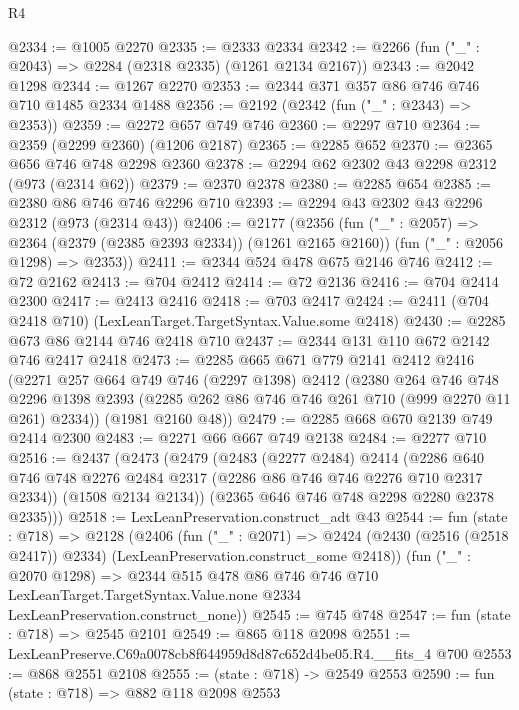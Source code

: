 \begin{lexlean}{R4}
\begin{coremodule}
@2334 := @1005 @2270
@2335 := @2333 @2334
@2342 := @2266 (fun ("_" : @2043) => @2284 (@2318 @2335) (@1261 @2134 @2167))
@2343 := @2042 @1298
@2344 := @1267 @2270
@2353 := @2344 @371 @357 @86 @746 @746 @710 @1485 @2334 @1488
@2356 := @2192 (@2342 (fun ("_" : @2343) => @2353))
@2359 := @2272 @657 @749 @746
@2360 := @2297 @710
@2364 := @2359 (@2299 @2360) (@1206 @2187)
@2365 := @2285 @652
@2370 := @2365 @656 @746 @748 @2298 @2360
@2378 := @2294 @62 @2302 @43 @2298 @2312 (@973 (@2314 @62))
@2379 := @2370 @2378
@2380 := @2285 @654
@2385 := @2380 @86 @746 @746 @2296 @710
@2393 := @2294 @43 @2302 @43 @2296 @2312 (@973 (@2314 @43))
@2406 := @2177
    (@2356
      (fun ("_" : @2057) => @2364 (@2379 (@2385 @2393 @2334)) (@1261 @2165 @2160))
      (fun ("_" : @2056 @1298) => @2353))
@2411 := @2344 @524 @478 @675 @2146 @746
@2412 := @72 @2162
@2413 := @704 @2412
@2414 := @72 @2136
@2416 := @704 @2414 @2300
@2417 := @2413 @2416
@2418 := @703 @2417
@2424 := @2411 (@704 @2418 @710) (LexLeanTarget.TargetSyntax.Value.some @2418)
@2430 := @2285 @673 @86 @2144 @746 @2418 @710
@2437 := @2344 @131 @110 @672 @2142 @746 @2417 @2418
@2473 := @2285
    @665
    @671
    @779
    @2141
    @2412
    @2416
    (@2271
      @257
      @664
      @749
      @746
      (@2297 @1398)
      @2412
      (@2380
        @264
        @746
        @748
        @2296
        @1398
        @2393
        (@2285 @262 @86 @746 @746 @261 @710 (@999 @2270 @11 @261) @2334))
      (@1981 @2160 @48))
@2479 := @2285 @668 @670 @2139 @749 @2414 @2300
@2483 := @2271 @66 @667 @749 @2138
@2484 := @2277 @710
@2516 := @2437
    (@2473
      (@2479
        (@2483
          (@2277 @2484)
          @2414
          (@2286 @640 @746 @748 @2276 @2484 @2317 (@2286 @86 @746 @746 @2276 @710 @2317 @2334))
          (@1508 @2134 @2134))
        (@2365 @646 @746 @748 @2298 @2280 @2378 @2335)))
@2518 := LexLeanPreservation.construct_adt @43
@2544 := fun (state : @718) =>
  @2128
    (@2406
      (fun ("_" : @2071) =>
      @2424 (@2430 (@2516 (@2518 @2417)) @2334) (LexLeanPreservation.construct_some @2418))
      (fun ("_" : @2070 @1298) =>
      @2344
        @515
        @478
        @86
        @746
        @746
        @710
        LexLeanTarget.TargetSyntax.Value.none
        @2334
        LexLeanPreservation.construct_none))
@2545 := @745 @748
@2547 := fun (state : @718) => @2545 @2101
@2549 := @865 @118 @2098
@2551 := LexLeanPreserve.C69a0078cb8f644959d8d87c652d4be05.R4.__fits_4 @700
@2553 := @868 @2551 @2108
@2555 := (state : @718) -> @2549 @2553
@2590 := fun (state : @718) =>
  @882
    @118
    @2098
    @2553

\end{coremodule}
\end{lexlean}
